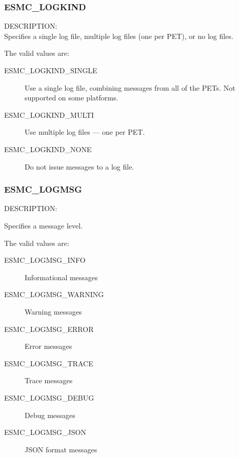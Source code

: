 

\subsubsection{ESMC\_LOGKIND}
\label{const:clogkindflag}

{\sf DESCRIPTION:\\}
Specifies a single log file, multiple log files (one per PET), or no log files.

The valid values are:
\begin{description}
   \item [ESMC\_LOGKIND\_SINGLE] 
         Use a single log file, combining messages from all of the PETs.  Not supported on some platforms.
   \item [ESMC\_LOGKIND\_MULTI]
         Use multiple log files --- one per PET.
   \item [ESMC\_LOGKIND\_NONE]
         Do not issue messages to a log file.
\end{description}


\subsubsection{ESMC\_LOGMSG}
\label{const:clogmsgflag}

{\sf DESCRIPTION:\\}
\begin{sloppypar}
Specifies a message level.
\end{sloppypar}

The valid values are:
\begin{description}
   \item [ESMC\_LOGMSG\_INFO] 
         Informational messages
   \item [ESMC\_LOGMSG\_WARNING]
         Warning messages
   \item [ESMC\_LOGMSG\_ERROR]
         Error messages
   \item [ESMC\_LOGMSG\_TRACE]
         Trace messages
   \item [ESMC\_LOGMSG\_DEBUG]
         Debug messages
   \item [ESMC\_LOGMSG\_JSON]
         JSON format messages
\end{description}
